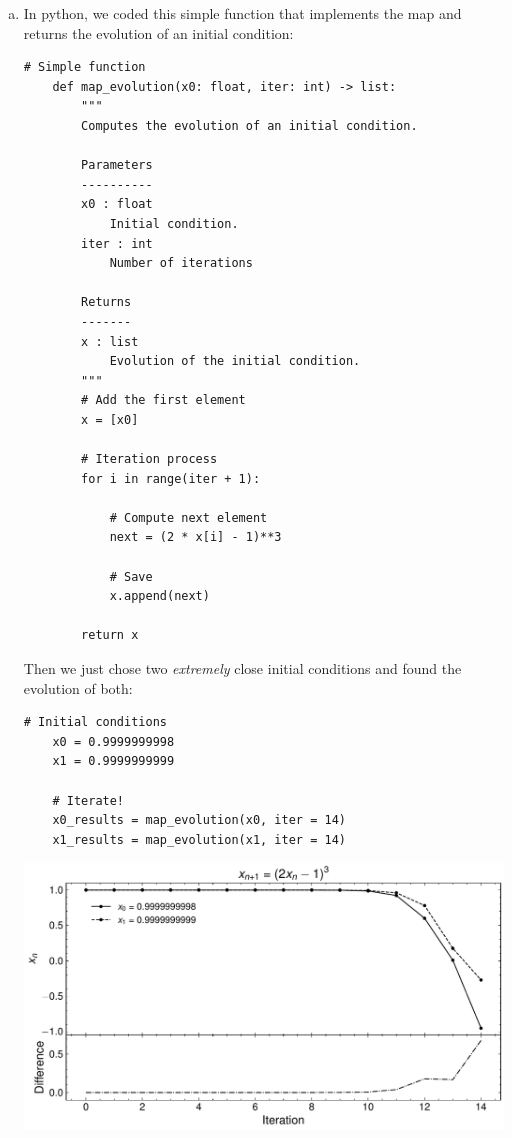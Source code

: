 \begin{enumerate}[(a)]
    \item In python, we coded this simple function that implements
    the map and returns the evolution of an initial condition:
    \begin{lstlisting}[style=pythonstyle]
    # Simple function
    def map_evolution(x0: float, iter: int) -> list:
        """
        Computes the evolution of an initial condition.

        Parameters
        ----------
        x0 : float
            Initial condition.
        iter : int
            Number of iterations

        Returns
        -------
        x : list
            Evolution of the initial condition.
        """
        # Add the first element
        x = [x0]

        # Iteration process
        for i in range(iter + 1):
            
            # Compute next element
            next = (2 * x[i] - 1)**3

            # Save
            x.append(next)

        return x
    \end{lstlisting}

    Then we just chose two \textit{extremely} close initial conditions
    and found the evolution of both:
    \begin{lstlisting}[style=pythonstyle]
    # Initial conditions
    x0 = 0.9999999998
    x1 = 0.9999999999

    # Iterate!
    x0_results = map_evolution(x0, iter = 14)
    x1_results = map_evolution(x1, iter = 14)
    \end{lstlisting}

    \begin{center}
        \includegraphics[scale=0.7]{images/4a.pdf}
        \label{fig:4a}
    \end{center}


\end{enumerate}
